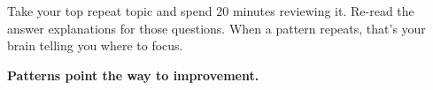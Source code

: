 {\begin{tcolorbox}[
    enhanced,
    colback=funYellowLight,
    colframe=funYellow!60,
    arc=10pt,
    boxrule=1pt,
    left=6mm, right=6mm, top=4mm, bottom=4mm,
]
\vspace{2mm}

Take your top repeat topic and spend 20 minutes reviewing it. Re-read the answer explanations for those questions. When a pattern repeats, that's your brain telling you where to focus.
\end{tcolorbox}

\vspace{4mm}

\begin{center}
{\large\bfseries\color{funOrangeDark} \faCompass\hspace{2mm}Patterns point the way to improvement.\hspace{2mm}\faCompass}
\end{center}

}
\newpage
